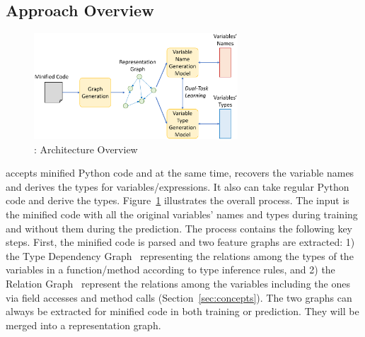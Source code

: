 \subsection{Approach Overview}


\begin{figure}[t]
	\begin{center}
	  \includegraphics[width=3in]{figures/overview-2.png}
          \vspace{-10pt}
		\caption{{\tool}: Architecture Overview}
		\label{overview}
	\end{center}
\end{figure}



{\tool} accepts minified Python code and at the same time, recovers
the variable names and derives the types for variables/expressions. It
also can take regular Python code and derive the types.
%
Figure~\ref{overview} illustrates the overall process. The input is
the minified code with all the original variables' names and types
during training and without them during the prediction.
%
The process contains the following key steps. First, the minified code
is parsed and two feature graphs are extracted: 1) the Type Dependency
Graph~\cite{HiTyper-icse22} representing the relations among the
types of the variables in a function/method according to type
inference rules, and 2) the Relation Graph~\cite{icse19} represent the
relations among the variables including the ones via field accesses
and method calls (Section~\ref{sec:concepts}). The two graphs can
always be extracted for minified code in both training or
prediction. They will be merged into a representation graph.


